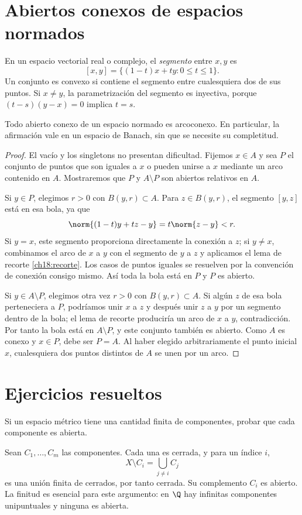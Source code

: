\section{Abiertos conexos de espacios normados}
\begin{definicion}
En un espacio vectorial real o complejo, el \emph{segmento} entre $x,y$ es
\[
[x,y]=\{(1-t)x+ty:0\le t\le1\}.
\]
Un conjunto es convexo si contiene el segmento entre cualesquiera dos de sus puntos. Si $x\ne y$, la parametrización del segmento es inyectiva, porque $(t-s)(y-x)=0$ implica $t=s$.
\end{definicion}

\begin{teorema}\label{ch18:abiertoconexo}
Todo abierto conexo de un espacio normado es arcoconexo. En particular, la afirmación vale en un espacio de Banach, sin que se necesite su completitud.
\end{teorema}
\begin{proof}
El vacío y los singletons no presentan dificultad. Fijemos $x\in A$ y sea $P$ el conjunto de puntos que son iguales a $x$ o pueden unirse a $x$ mediante un arco contenido en $A$. Mostraremos que $P$ y $A\setminus P$ son abiertos relativos en $A$.

Si $y\in P$, elegimos $r>0$ con $B(y,r)\subset A$. Para $z\in B(y,r)$, el segmento $[y,z]$ está en esa bola, ya que
\[
\norm{(1-t)y+tz-y}=t\norm{z-y}<r.
\]
Si $y=x$, este segmento proporciona directamente la conexión a $z$; si $y\ne x$, combinamos el arco de $x$ a $y$ con el segmento de $y$ a $z$ y aplicamos el lema de recorte \ref{ch18:recorte}. Los casos de puntos iguales se resuelven por la convención de conexión consigo mismo. Así toda la bola está en $P$ y $P$ es abierto.

Si $y\in A\setminus P$, elegimos otra vez $r>0$ con $B(y,r)\subset A$. Si algún $z$ de esa bola perteneciera a $P$, podríamos unir $x$ a $z$ y después unir $z$ a $y$ por un segmento dentro de la bola; el lema de recorte produciría un arco de $x$ a $y$, contradicción. Por tanto la bola está en $A\setminus P$, y este conjunto también es abierto. Como $A$ es conexo y $x\in P$, debe ser $P=A$. Al haber elegido arbitrariamente el punto inicial $x$, cualesquiera dos puntos distintos de $A$ se unen por un arco.
\end{proof}

\section{Ejercicios resueltos}
\begin{ejercicio}
Si un espacio métrico tiene una cantidad finita de componentes, probar que cada componente es abierta.
\end{ejercicio}
\begin{solucion}
Sean $C_1,\ldots,C_m$ las componentes. Cada una es cerrada, y para un índice $i$,
\[
X\setminus C_i=\bigcup_{j\ne i}C_j
\]
es una unión finita de cerrados, por tanto cerrada. Su complemento $C_i$ es abierto. La finitud es esencial para este argumento: en $\Q$ hay infinitas componentes unipuntuales y ninguna es abierta.
\end{solucion}

